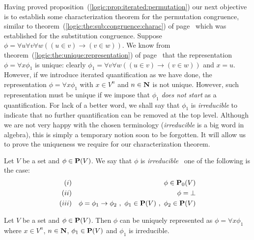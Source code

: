 Having proved proposition~(\ref{logic:prop:iterated:permutation})
our next objective is to establish some characterization theorem for
the permutation congruence, similar to
theorem~(\ref{logic:the:sub:congruence:charac}) of
page~\pageref{logic:the:sub:congruence:charac} which was established
for the substitution congruence. Suppose $\phi=\forall u\forall
v\forall w((u\in v)\to(v\in w))$. We know from
theorem~(\ref{logic:the:unique:representation}) of
page~\pageref{logic:the:unique:representation} that the
representation $\phi=\forall x\phi_{1}$ is unique: clearly
$\phi_{1}=\forall v\forall w((u\in v)\to(v\in w))$ and $x=u$.
However, if we introduce iterated quantification as we have done,
the representation $\phi=\forall x\phi_{1}$ with $x\in V^{n}$ and
$n\in\mbox{$\bf N$}$ is not unique. However, such representation must be unique
if we impose that $\phi_{1}$ {\em does not start} as a
quantification. For lack of a better word, we shall say that
$\phi_{1}$ is {\em irreducible} to indicate that no further
quantification can be removed at the top level. Although we are not
very happy with the chosen terminology ({\em irreducible} is a big
word in algebra), this is simply a temporary notion soon to be
forgotten. It will allow us to prove the uniqueness we require for
our characterization theorem.
\begin{defin}\label{logic:def:irreducible:formula}
Let $V$ be a set and $\phi\in\mbox{${\bf P}(V)$}$. We say that $\phi$ is {\em
irreducible} \ifand\ one of the following is the case:
    \begin{eqnarray*}
    (i)&&\phi\in\pvo\\
    (ii)&&\phi=\bot\\
    (iii)&&\phi=\phi_{1}\to\phi_{2}\ ,\ \phi_{1}\in\pv\ ,\ \phi_{2}\in\pv
    \end{eqnarray*}
\end{defin}
\begin{prop}\label{logic:prop:irreducible:formula}
Let $V$ be a set and $\phi\in\mbox{${\bf P}(V)$}$. Then $\phi$ can be uniquely
represented as $\phi=\forall x\phi_{1}$ where $x\in V^{n}$,
$n\in\mbox{$\bf N$}$, $\phi_{1}\in\mbox{${\bf P}(V)$}$ and $\phi_{1}$ is irreducible.
\end{prop}
